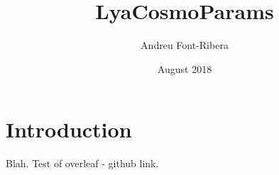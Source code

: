 \documentclass{article}
\title{LyaCosmoParams}
\author{Andreu Font-Ribera}
\date{August 2018}
\begin{document}
\maketitle

\section{Introduction}

Blah. Test of overleaf - github link.
\end{document}

